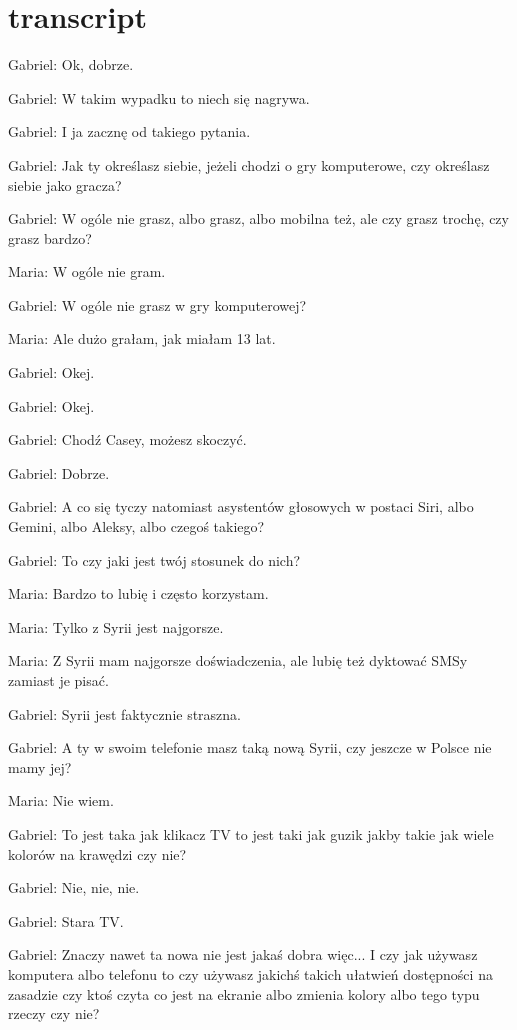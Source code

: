 
\section{transcript}

Gabriel: Ok, dobrze.

Gabriel: W takim wypadku to niech się nagrywa.

Gabriel: I ja zacznę od takiego pytania.

Gabriel: Jak ty określasz siebie, jeżeli chodzi o gry komputerowe, czy określasz siebie jako gracza?

Gabriel: W ogóle nie grasz, albo grasz, albo mobilna też, ale czy grasz trochę, czy grasz bardzo?

Maria: W ogóle nie gram.

Gabriel: W ogóle nie grasz w gry komputerowej?

Maria: Ale dużo grałam, jak miałam 13 lat.

Gabriel: Okej.

Gabriel: Okej.

Gabriel: Chodź Casey, możesz skoczyć.

Gabriel: Dobrze.

Gabriel: A co się tyczy natomiast asystentów głosowych w postaci Siri, albo Gemini, albo Aleksy, albo czegoś takiego?

Gabriel: To czy jaki jest twój stosunek do nich?

Maria: Bardzo to lubię i często korzystam.

Maria: Tylko z Syrii jest najgorsze.

Maria: Z Syrii mam najgorsze doświadczenia, ale lubię też dyktować SMSy zamiast je pisać.

Gabriel: Syrii jest faktycznie straszna.

Gabriel: A ty w swoim telefonie masz taką nową Syrii, czy jeszcze w Polsce nie mamy jej?

Maria: Nie wiem.

Gabriel: To jest taka jak klikacz TV to jest taki jak guzik jakby takie jak wiele kolorów na krawędzi czy nie?

Gabriel: Nie, nie, nie.

Gabriel: Stara TV.

Gabriel: Znaczy nawet ta nowa nie jest jakaś dobra więc... I czy jak używasz komputera albo telefonu to czy używasz jakichś takich ułatwień dostępności na zasadzie czy ktoś czyta co jest na ekranie albo zmienia kolory albo tego typu rzeczy czy nie?

